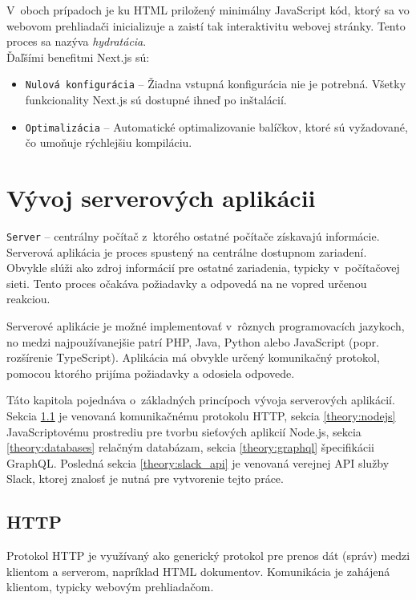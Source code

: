 \noindent V~oboch prípadoch je ku HTML priložený minimálny JavaScript kód, ktorý sa vo webovom prehliadači inicializuje a zaistí tak interaktivitu webovej stránky. Tento proces sa nazýva \emph{hydratácia}. \cite{NextJS} \\

\noindent Ďaľšími benefitmi Next.js sú:
\begin{itemize}
	\item \texttt{Nulová konfigurácia} -- Žiadna vstupná konfigurácia nie je potrebná. Všetky funkcionality Next.js sú dostupné ihneď po inštalácií. \cite{NextJS}
	\item \texttt{Optimalizácia} -- Automatické optimalizovanie balíčkov, ktoré sú vyžadované, čo umoňuje rýchlejšiu kompiláciu. \cite{NextJS}
\end{itemize}

\chapter{Vývoj serverových aplikácii}
\label{theory:server_dev}
\texttt{Server} -- centrálny počítač z~ktorého ostatné počítače získavajú informácie. \cite{CamDict} \\

\noindent Serverová aplikácia je proces spustený na centrálne dostupnom zariadení. Obvykle slúži ako zdroj informácií pre ostatné zariadenia, typicky v~počítačovej sieti. Tento proces očakáva požiadavky a odpovedá na ne vopred určenou reakciou.

Serverové aplikácie je možné implementovať v~rôznych programovacích jazykoch, no medzi najpoužívanejšie patrí PHP, Java, Python alebo JavaScript (popr. rozšírenie TypeScript). Aplikácia má obvykle určený komunikačný protokol, pomocou ktorého prijíma požiadavky a odosiela odpovede.

Táto kapitola pojednáva o~základných princípoch vývoja serverových aplikácií. Sekcia \ref{theory:HTTP} je venovaná komunikačnému protokolu HTTP, sekcia \ref{theory:nodejs} JavaScriptovému prostrediu pre tvorbu sieťových aplikcií Node.js, sekcia \ref{theory:databases} relačným databázam, sekcia \ref{theory:graphql} špecifikácii GraphQL. Posledná sekcia \ref{theory:slack_api} je venovaná verejnej API služby Slack, ktorej znalosť je nutná pre vytvorenie tejto práce.

\section{HTTP}
\label{theory:HTTP}
Protokol HTTP je využívaný ako generický protokol pre prenos dát (správ) medzi klientom a serverom, napríklad HTML dokumentov. Komunikácia je zahájená klientom, typicky webovým prehliadačom.

